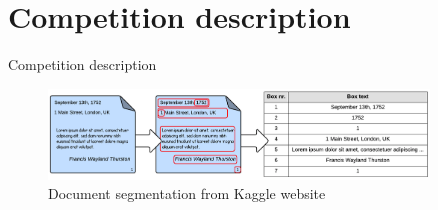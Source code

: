 \documentclass{beamer}
\begin{document}


	\section{Competition description}
	\begin{frame}{Competition description}
	
		\begin{figure}[h]
			\begin{center}
				\includegraphics[width=0.9\textwidth]{FeatureExtraction1.png}
			\end{center}
			\caption{Document segmentation from Kaggle website 
			\label{fig:FeatureExtraction1}}
		\end{figure}

	\end{frame}
\end{document}
